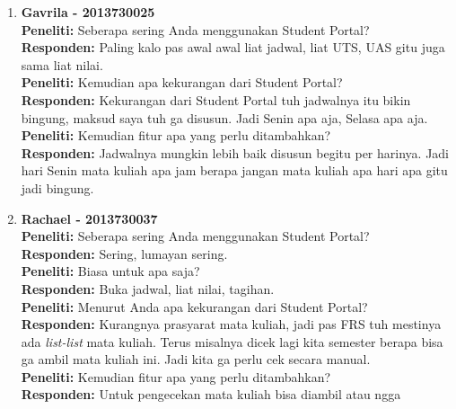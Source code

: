 \begin{enumerate}
\item\textbf{Gavrila - 2013730025}\\
	\textbf{Peneliti:} Seberapa sering Anda menggunakan Student Portal?\\
	\textbf{Responden:} Paling kalo pas awal awal liat jadwal, liat UTS, UAS gitu juga sama liat nilai.\\
	\textbf{Peneliti:} Kemudian apa kekurangan dari Student Portal?\\
	\textbf{Responden:} Kekurangan dari Student Portal tuh jadwalnya itu bikin bingung, maksud saya tuh ga disusun. Jadi Senin apa aja, Selasa apa aja.\\
	\textbf{Peneliti:} Kemudian fitur apa yang perlu ditambahkan?\\
	\textbf{Responden:} Jadwalnya mungkin lebih baik disusun begitu per harinya. Jadi hari Senin mata kuliah apa jam berapa jangan mata kuliah apa hari apa gitu jadi bingung.\\
	
	\item\textbf{Rachael - 2013730037}\\
	\textbf{Peneliti:} Seberapa sering Anda menggunakan Student Portal?\\
	\textbf{Responden:} Sering, lumayan sering.\\
	\textbf{Peneliti:} Biasa untuk apa saja?\\
	\textbf{Responden:} Buka jadwal, liat nilai, tagihan.\\
	\textbf{Peneliti:} Menurut Anda apa kekurangan dari Student Portal?\\
	\textbf{Responden:} Kurangnya prasyarat mata kuliah, jadi pas FRS tuh mestinya ada \textit{list-list} mata kuliah. Terus misalnya dicek lagi kita semester berapa bisa ga ambil mata kuliah ini. Jadi kita ga perlu cek secara manual.\\
	\textbf{Peneliti:} Kemudian fitur apa yang perlu ditambahkan?\\
	\textbf{Responden:} Untuk pengecekan mata kuliah bisa diambil atau ngga\\
	

\end{enumerate}
